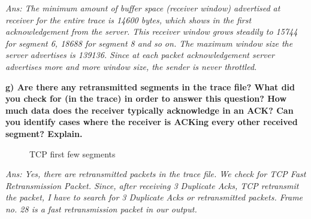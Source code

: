 \documentclass[11pt]{article}
\numberwithin{equation}{section}
\begin{document}
\textsl{Ans: The minimum amount of buffer space (receiver window) advertised at receiver for the entire trace is 14600 bytes, which shows in the first acknowledgement from the server. This receiver window grows steadily to 15744 for segment 6, 18688 for segment 8 and so on. The maximum window size the server advertises is 139136. Since at each packet acknowledgement server advertises more and more window size, the sender is never throttled. }\newline

\textbf{ g) Are there any retransmitted segments in the trace file? What did you check for (in the trace) in order to answer this question? How much data does the receiver typically acknowledge in an ACK? Can you identify cases where the receiver is ACKing every other received segment? Explain. }

\begin{figure}[H]
\begin{center}
		\centering
		\caption{TCP first few segments}
		\label{fig:q1_f1_a}
\end{center}
\end{figure}

\textsl{Ans: Yes, there are retransmitted packets in the trace file. We check for TCP Fast Retransmission Packet. Since, after receiving 3 Duplicate Acks, TCP retransmit the packet, I have to search for 3 Duplicate Acks or retransmitted packets. Frame no. 28 is a fast retransmission packet in our output. }
\end{document}
